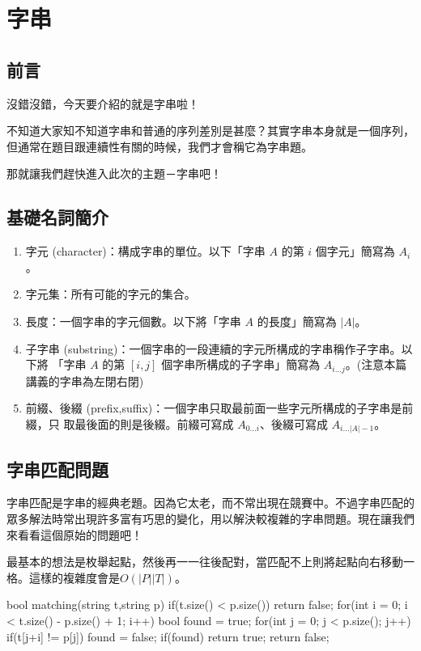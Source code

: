\documentclass[main.tex]{subfiles}
\begin{document}
\chapter{字串\uppercase\expandafter{}}

\section{前言}
沒錯沒錯，今天要介紹的就是字串啦！

不知道大家知不知道字串和普通的序列差別是甚麼？其實字串本身就是一個序列，但通常在題目跟連續性有關的時候，我們才會稱它為字串題。

那就讓我們趕快進入此次的主題－字串吧！
\section{基礎名詞簡介}
\begin{enumerate}
\item 字元 (character)：構成字串的單位。以下「字串 $A$ 的第 $i$ 個字元」簡寫為 $A_i$。
\item 字元集：所有可能的字元的集合。
\item 長度：一個字串的字元個數。以下將「字串 $A$ 的長度」簡寫為 $|A|$。
\item 子字串 (substring)：一個字串的一段連續的字元所構成的字串稱作子字串。以下將
「字串 $A$ 的第 $[i, j]$ 個字串所構成的子字串」簡寫為 $A_{i...j}$。(注意本篇講義的字串為左閉右閉)
\item 前綴、後綴 (prefix,suffix)：一個字串只取最前面一些字元所構成的子字串是前綴，只
取最後面的則是後綴。前綴可寫成 $A_{0...i}$、後綴可寫成 $A_{i...|A|-1}$。
\end{enumerate}

\section{字串匹配問題}
字串匹配是字串的經典老題。因為它太老，而不常出現在競賽中。不過字串匹配的眾多解法時常出現許多富有巧思的變化，用以解決較複雜的字串問題。現在讓我們來看看這個原始的問題吧！\\


最基本的想法是枚舉起點，然後再一一往後配對，當匹配不上則將起點向右移動一格。這樣的複雜度會是$O(|P||T|)$。\\

\begin{C++}
bool matching(string t,string p){
    if(t.size() < p.size()) return false;
    for(int i = 0; i < t.size() - p.size() + 1; i++){
        bool found = true;
        for(int j = 0; j < p.size(); j++)
            if(t[j+i] != p[j]) found = false;
        if(found) return true;
    }
    return false;
}
\end{C++}
\end{document}

